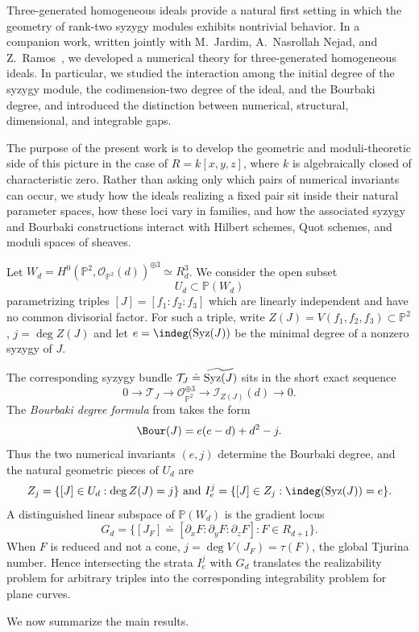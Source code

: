 \documentclass[11pt]{amsart} %
\theoremstyle{definition}
\def\syz{\mbox{\rm Syz}}
\def\NZQ{\mathbb}               %
\def\PP{{\NZQ P}}
\def\T{{\mathcal T}}
\begin{document}
Three-generated homogeneous ideals provide a natural first setting
in which the geometry of rank-two syzygy modules exhibits
nontrivial behavior. In a companion work, written jointly with M.~Jardim,
A.~Nasrollah Nejad, and Z.~Ramos~\cite{JMNRS2026}, we developed
a numerical theory for three-generated homogeneous ideals. In
particular, we studied the interaction among the initial degree of the syzygy module, the codimension-two degree of the ideal, and the
Bourbaki degree, and introduced the distinction between numerical,
structural, dimensional, and integrable gaps.

The purpose of the present work is to develop the geometric and
moduli-theoretic side of this picture in the case of $R = k[x,y,z]$, where $k$ is algebraically closed of characteristic zero. Rather than asking only which pairs of numerical invariants can occur, we study how the ideals
realizing a fixed pair sit inside their natural parameter spaces,
how these loci vary in families, and how the associated syzygy and
Bourbaki constructions interact with Hilbert schemes, Quot schemes,
and moduli spaces of sheaves.

Let \(W_d=H^0(\PP^2,\mathcal O_{\PP^2}(d))^{\oplus3}\simeq R_d^3\). We consider
the open subset
\[
U_d\subset\PP(W_d)
\]
parametrizing triples \([J]=[f_1:f_2:f_3]\) which are linearly independent and have no common divisorial factor.
For such a triple, write \(
Z(J)=V(f_1,f_2,f_3)\subset\PP^2\), \(j=\deg Z(J)\) and let \(e=\indeg(\syz(J))\) be the minimal degree of a nonzero syzygy of $J$.

The corresponding syzygy bundle $\T_J \doteq \widetilde{\syz(J)}$ sits in the short exact sequence
\[
0\longrightarrow
\T_J
\longrightarrow
\mathcal O_{\PP^2}^{\oplus3}
\longrightarrow
\mathcal I_{Z(J)}(d)
\longrightarrow0.
\]
The \emph{Bourbaki degree formula} from \cite{JMNRS2026} takes the form
\[
\Bour(J)=e(e-d)+d^2-j.
\]
Thus the two numerical invariants $(e,j)$ determine the Bourbaki
degree, and the natural geometric pieces of $U_d$ are
\[
Z_j
=
\{[J]\in U_d:\deg Z(J)=j\} \text{ and }I_e^j=\{[J]\in Z_j:\indeg(\syz(J))=e\}.
\]
A distinguished linear subspace of $\PP(W_d)$ is the gradient locus
\[
G_d
=
\{[J_F]\doteq[\partial_xF:\partial_yF:\partial_zF]:
F\in R_{d+1}\}.
\]
When $F$ is reduced and not a cone, \(
j=\deg V(J_F)=\tau(F)\), the global Tjurina number. Hence intersecting the strata $I_e^j$
with $G_d$ translates the realizability problem for arbitrary triples into the corresponding integrability problem for plane curves.

We now summarize the main results.
\end{document}
